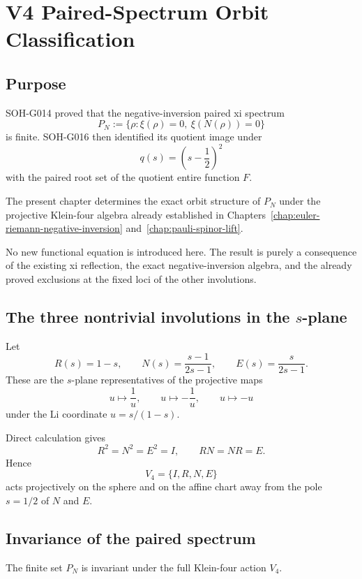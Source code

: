 \chapter{V4 Paired-Spectrum Orbit Classification}
\label{chap:v4-paired-spectrum-orbits}


\section{Purpose}

SOH-G014 proved that the negative-inversion paired xi spectrum
\[
 P_N:=\{\rho:\xi(\rho)=0,\ \xi(N(\rho))=0\}
\]
is finite.  SOH-G016 then identified its quotient image under
\[
 q(s)=\left(s-\frac12\right)^2
\]
with the paired root set of the quotient entire function $F$.

The present chapter determines the exact orbit structure of $P_N$ under the projective Klein-four algebra already established in Chapters~\ref{chap:euler-riemann-negative-inversion} and~\ref{chap:pauli-spinor-lift}.

No new functional equation is introduced here.  The result is purely a consequence of the existing xi reflection, the exact negative-inversion algebra, and the already proved exclusions at the fixed loci of the other involutions.

\section{The three nontrivial involutions in the $s$-plane}

Let
\[
 R(s)=1-s,
 \qquad
 N(s)=\frac{s-1}{2s-1},
 \qquad
 E(s)=\frac{s}{2s-1}.
\]
These are the $s$-plane representatives of the projective maps
\[
 u\mapsto \frac1u,
 \qquad
 u\mapsto -\frac1u,
 \qquad
 u\mapsto -u
\]
under the Li coordinate $u=s/(1-s)$.

Direct calculation gives
\[
 R^2=N^2=E^2=I,
 \qquad
 RN=NR=E.
\]
Hence
\[
 V_4=\{I,R,N,E\}
\]
acts projectively on the sphere and on the affine chart away from the pole $s=1/2$ of $N$ and $E$.

\section{Invariance of the paired spectrum}

\begin{theorem}
The finite set $P_N$ is invariant under the full Klein-four action $V_4$.
\end{theorem}

